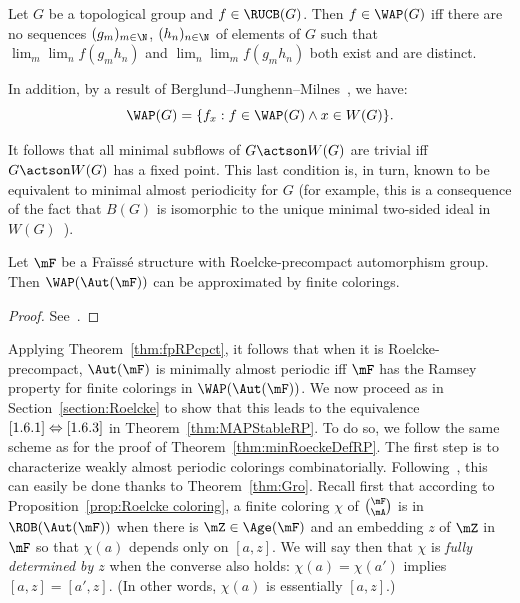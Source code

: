 \begin{theo}
\label{thm:Gro}
Let $G$ be a topological group and $f\in \RUCB(G)$. Then $f\in \WAP(G)$ iff there are no sequences $(g_{m})_{m\in \N}$, $(h_{n})_{n\in \N}$ of elements of $G$ such that $\displaystyle \lim_{m}\lim_{n}f(g_{m}h_{n})$ and $\displaystyle \lim_{n}\lim_{m}f(g_{m}h_{n})$ both exist and are distinct.
\end{theo}

In addition, by a result of Berglund--Junghenn--Milnes~\cite[Chapter~III,\linebreak Lemma~8.8]{BJM}, we have:
\[
\WAP(G)=\{ f_{x}:f\in \WAP(G) \wedge x\in W(G)\}.
\]

It follows that all minimal subflows of $G\actson W(G)$ are trivial iff $G\actson W(G)$ has a fixed point. This last condition is, in turn, known to be equivalent to minimal almost periodicity for $G$ (for example, this is a consequence of the fact that $B(G)$ is isomorphic to the unique minimal two-sided ideal in $W(G)$~\cite[Chapter~III, Section~1.9]{Ru}).

\begin{prop}\label{prop:ApproxWAP}
Let $\mF$ be a Fra\"{\i}ss\'e structure with Roelcke-precompact automorphism group. Then $\WAP(\Aut(\mF))$ can be approximated by finite colorings.
\end{prop}

\begin{proof}
See~\cite[Proposition~4.7]{BYT}.
\end{proof}

Applying Theorem~\ref{thm:fpRPcpct}, it follows that when it is Roelcke-precompact, $\Aut(\mF)$ is minimally almost periodic iff $\mF$ has the Ramsey property for finite colorings in $\WAP(\Aut(\mF))$. We now proceed as in Section~\ref{section:Roelcke} to show that this leads to the equivalence $\eqref{1.6.1}\Leftrightarrow \eqref{1.6.3}$ in Theorem~\ref{thm:MAPStableRP}. To do so, we follow the same scheme as for the proof of Theorem~\ref{thm:minRoeckeDefRP}. The first step is to characterize weakly almost periodic colorings combinatorially. Following~\cite{BYT}, this can easily be done thanks to Theorem~\ref{thm:Gro}. Recall first that according to Proposition~\ref{prop:Roelcke coloring}, a finite coloring $\chi$ of $\binom{\mF}{\mA}$ is in $\ROB(\Aut(\mF))$ when there is $\mZ \in \Age(\mF)$ and an embedding $z$ of $\mZ$ in $\mF$ so that $\chi(a)$ depends only on $[a,z]$. We will say then that $\chi$ is \emph{fully determined by $z$} when the converse also holds: $\chi(a)=\chi(a')$ implies $[a,z]=[a',z]$. (In other words, $\chi(a)$ is essentially $[a,z]$.)

